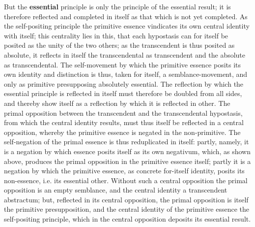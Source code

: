 \documentclass[12pt,a4paper,openany]{book}
\newcommand{\opage}[1]{\marginnote{\footnotesize\textit{[#1]}}}
\begin{document}
But the \textbf{essential} principle is only the principle of the essential result; it is therefore reflected and completed in itself as that which is not yet completed. As the self-positing principle the primitive essence vindicates its own central identity with itself; this centrality lies in this, that each hypostasis can for itself be posited as the unity of the two others; as the transcendent is thus posited as absolute, it reflects in itself the transcendental as transcendent and the absolute as transcendental. The self-movement by which the primitive essence posits its own identity and distinction is thus, taken for itself, a semblance-movement,
\setcounter{footnote}{0}%
\opage{119}and only as primitive presupposing absolutely essential. The reflection by which the essential principle is reflected in itself must therefore be doubled from all sides, and thereby show itself as a reflection by which it is reflected in other. The primal opposition between the transcendent and the transcendental hypostasis, from which the central identity results, must thus itself be reflected in a central opposition, whereby the primitive essence is negated in the non-primitive. The self-negation of the primal essence is thus reduplicated in itself: partly, namely, it is a negation by which essence posits itself as its own negativum, which, as shown above, produces the primal opposition in the primitive essence itself; partly it is a negation by which the primitive essence, as concrete for-itself identity, posits its non-essence, i.e. its essential other. Without such a central opposition the primal opposition is an empty semblance, and the central identity a transcendent abstractum; but, reflected in its central opposition, the primal opposition is itself the primitive presupposition, and the central identity of the primitive essence the self-positing principle, which in the central opposition deposits its essential result.
\end{document}
